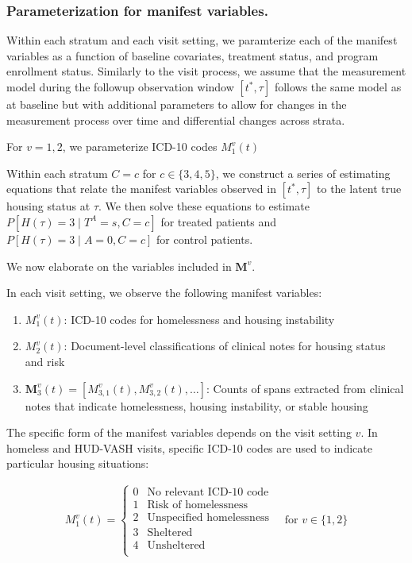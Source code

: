 \subsubsection{Parameterization for manifest variables.}
Within each stratum and each visit setting, we paramterize each of the manifest variables as a function of baseline covariates, treatment status, and program enrollment status. Similarly to the visit process, we assume that the measurement model during the followup observation window $[t^*, \tau]$ follows the same model as at baseline but with additional parameters to allow for changes in the measurement process over time and differential changes across strata.

For $v=1, 2$, we parameterize ICD-10 codes  $M_1^v(t)$ 


Within each stratum $C=c$ for $c\in\{3,4,5\}$, we construct a series of estimating equations that relate the manifest variables observed in $[t^*,\tau]$ to the latent true housing status at $\tau$. We then solve these equations to estimate $P[H(\tau)=3\mid T^A=s, C=c]$ for treated patients and $P[H(\tau)=3\mid A=0, C=c]$ for control patients.

We now elaborate on the variables included in $\boldsymbol{M}^v$. 

In each visit setting, we observe the following manifest variables:
\begin{enumerate}
    \item $M_1^v(t)$: ICD-10 codes for homelessness and housing instability
    \item $M_2^v(t)$: Document-level classifications of clinical notes for housing status and risk
    \item $\boldsymbol{M}_3^v(t)=[M_{3,1}^v(t), M_{3,2}^v(t), \ldots]$: Counts of spans extracted from clinical notes that indicate homelessness, housing instability, or stable housing
\end{enumerate}

The specific form of the manifest variables depends on the visit setting $v$. In homeless and HUD-VASH visits, specific ICD-10 codes are used to indicate particular housing situations:

\begin{align*}
    M_1^v(t) = \begin{cases}
        0 & \text{No relevant ICD-10 code} \\
        1 & \text{Risk of homelessness} \\
        2 & \text{Unspecified homelessness} \\
        3 & \text{Sheltered} \\
        4 & \text{Unsheltered} \\
    \end{cases} \quad \text{for } v \in \{1, 2\}
\end{align*}


